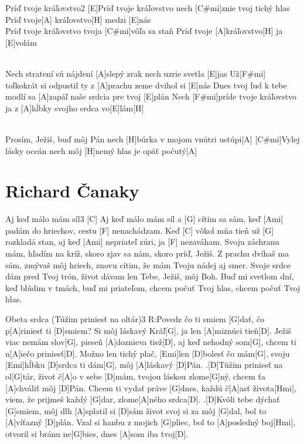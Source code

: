 \documentclass[12pt]{article}
\begin{document}
\begin{song}{Príď tvoje kráľovstvo}{2}
	[E]Príď tvoje kráľovstvo
	nech [C#mi]znie tvoj tichý hlas
	Príď tvoje[A] kráľovstvo[H]
	medzi [E]nás
	\\
	[E]Príď tvoje kráľovstvo
	tvoja [C#mi]vôľa sa staň
	Príď tvoje [A]kráľovstvo[H]
	ja [E]volám
	
	\\
	[F#mi]Nech stratení sú nájdení
	[A]slepý zrak nech uzrie svetla [E]jas
	Už[F#mi] toľkokrát si odpustil
	ty z [A]prachu zeme dvihol si [E]nás
	\columnbreak
	[F#mi]Dnes tvoj ľud k tebe modlí sa
	[A]zapáľ naše srdcia pre tvoj [E]plán
	Nech [F#mi]príde tvoje kráľovstvo
	ja z [A]hĺbky svojho srdca vo[E]lám[H]
	
	\\
	[C#mi]Prosím, Ježiš, buď môj Pán
	nech [H]búrka v mojom vnútri ustúpi[A]
	[C#mi]Vylej lásky oceán
	nech môj [H]nemý hlas je opäť počutý[A]
\end{song}


\newpage

\section{Richard Čanaky}

\begin{song}{Aj keď málo mám síl}{3}
	[C] Aj keď málo mám síl 
	a [G] cítim sa sám,
	keď [Ami] padám do hriechov, 
	cestu [F] nenachádzam.
	Keď [C] vôkol mňa tieň 
	už [G] rozkladá stan,
	aj keď [Ami] nepriateľ zúri, 
	ja [F] nezaváham.
	\columnbreak
	Svoju záchranu mám, 
	hľadím na kríž,
	skoro zjav sa nám, 
	skoro príď, Ježiš.
	Z prachu dvíhaš ma sám, 
	zmývaš môj hriech,
	znovu cítim, že mám 
	Tvoju nádej aj smer.
	\columnbreak
	Svoje srdce dám pred Tvoj 
	trón,
	život dávam len Tebe, 
	Ježiš, môj Boh.
	Buď mi svetlom dní, 
	keď blúdim v tmách,
	buď mi priateľom, 
	chcem počuť Tvoj hlas,
	chcem počuť Tvoj hlas.
\end{song}

\begin{song}{Obeta srdca (Túžim priniesť na oltár)}{3}
	R:Povedz čo ti smiem [G]dať, 
	čo p[A]riniesť ti [D]smiem?
	Si môj láskavý Kráľ[G], 
	ja len [A]miznúci tieň[D].
	Ježiš viac nemám slov[G], 
	pieseň [A]doznieva tiež[D],
	aj keď nehodný som[G], 
	chcem ti n[A]iečo priniesť[D].
	Možno len tichý plač, 
	[Emi]len [D]bolesť čo mám[G],
	svoju [Emi]hĺbku [D]srdca ti dám[G], 
	môj [A]láskavý [D]Pán.	
	.[D]Túžim priniesť na ol[G]tár, 
	život č[A]o v sebe [D]mám,
	tvojou láskou zlome[G]ný, 
	chcem ťa [A]chváliť môj [D]Pán.
	Chcem ti vydať práve [G]dnes, 
	každú č[A]asť života[Hmi],
	viem, že prijmeš každý [G]dar, 
	zlome[A]ného srdca[D].
	.[D]Kvôli tebe dýchať [G]smiem, 
	môj dlh [A]splatil si [D]sám
	život svoj si za môj [G]dal, 
	bol to [A]víťazný [D]plán.
	Vzal si hanbu z mojich [G]pliec, 
	bol to [A]posledný boj[Hmi], 
	otvoril si bránu ne[G]bies, 
	dnes [A]som iba tvoj[D].
\end{song}
	
\end{document}
